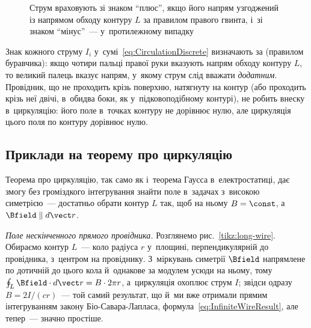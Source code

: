 \begin{figure}\centering
	\caption{Струм враховують зі знаком \enquote{плюс}, якщо його напрям узгоджений із
		напрямом обходу контуру $L$ за правилом правого гвинта, і~зі знаком
		\enquote{мінус}~--- у~протилежному випадку\label{pic:CirculationSigns}}
\end{figure}

\begin{Attention}
	Знак кожного струму $I_i$ у~сумі~\eqref{eq:CirculationDiscrete} визначають за
	 (правилом буравчика): якщо чотири пальці правої руки
	вказують напрям обходу контуру $L$, то великий палець вказує напрям, у~якому струм
	слід вважати \emph{додатним}. Провідник, що не проходить крізь поверхню, натягнуту на
	контур (або проходить крізь неї двічі, в~обидва боки, як у~підковоподібному контурі),
	не робить внеску в~циркуляцію: його поле в~точках контуру не дорівнює нулю, але
	циркуляція цього поля по контуру дорівнює нулю.
\end{Attention}


\subsection*{Приклади на теорему про циркуляцію}


Теорема про циркуляцію, так само як і~теорема Гаусса в~електростатиці, дає змогу без
громіздкого інтегрування знайти поле в~задачах з~високою симетрією~--- достатньо обрати
контур $L$ так, щоб на ньому $B = \const$, а~$\Bfield \parallel d\vect r$.

\emph{Поле нескінченного прямого провідника.} Розглянемо рис.~\ref{tikz:long-wire}.
Обираємо контур $L$~--- коло радіуса $r$ у~площині, перпендикулярній до провідника,
з~центром на провіднику. З~міркувань симетрії $\Bfield$ напрямлене по дотичній до цього
кола й~однакове за модулем усюди на ньому, тому $\oint_L \Bfield\cdot d\vect r = B\cdot
	2\pi r$, а~циркуляція охоплює струм $I$; звідси одразу $B = 2I/(cr)$~--- той самий
результат, що й~ми вже отримали прямим інтегруванням закону Біо-Савара-Лапласа,
формула~\eqref{eq:InfiniteWireResult}, але тепер~--- значно простіше.

